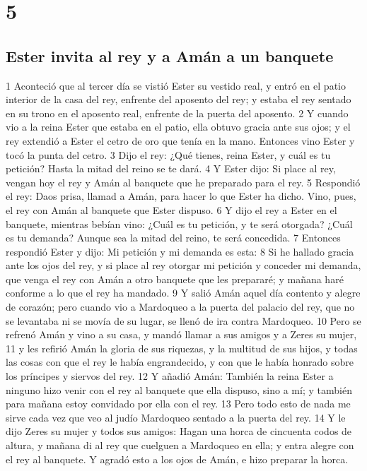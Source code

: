 \chapter{5}

\section*{Ester invita al rey y a Amán a un banquete}

1 Aconteció que al tercer día se vistió Ester su vestido real, y entró en el patio interior de la casa del rey, enfrente del aposento del rey; y estaba el rey sentado en su trono en el aposento real, enfrente de la puerta del aposento.
2 Y cuando vio a la reina Ester que estaba en el patio, ella obtuvo gracia ante sus ojos; y el rey extendió a Ester el cetro de oro que tenía en la mano. Entonces vino Ester y tocó la punta del cetro.
3 Dijo el rey: ¿Qué tienes, reina Ester, y cuál es tu petición? Hasta la mitad del reino se te dará.
4 Y Ester dijo: Si place al rey, vengan hoy el rey y Amán al banquete que he preparado para el rey.
5 Respondió el rey: Daos prisa, llamad a Amán, para hacer lo que Ester ha dicho. Vino, pues, el rey con Amán al banquete que Ester dispuso. 
6 Y dijo el rey a Ester en el banquete, mientras bebían vino: ¿Cuál es tu petición, y te será otorgada? ¿Cuál es tu demanda? Aunque sea la mitad del reino, te será concedida.
7 Entonces respondió Ester y dijo: Mi petición y mi demanda es esta:
8 Si he hallado gracia ante los ojos del rey, y si place al rey otorgar mi petición y conceder mi demanda, que venga el rey con Amán a otro banquete que les prepararé; y mañana haré conforme a lo que el rey ha mandado.
9 Y salió Amán aquel día contento y alegre de corazón; pero cuando vio a Mardoqueo a la puerta del palacio del rey, que no se levantaba ni se movía de su lugar, se llenó de ira contra Mardoqueo.
10 Pero se refrenó Amán y vino a su casa, y mandó llamar a sus amigos y a Zeres su mujer,
11 y les refirió Amán la gloria de sus riquezas, y la multitud de sus hijos, y todas las cosas con que el rey le había engrandecido, y con que le había honrado sobre los príncipes y siervos del rey.
12 Y añadió Amán: También la reina Ester a ninguno hizo venir con el rey al banquete que ella dispuso, sino a mí; y también para mañana estoy convidado por ella con el rey.
13 Pero todo esto de nada me sirve cada vez que veo al judío Mardoqueo sentado a la puerta del rey.
14 Y le dijo Zeres su mujer y todos sus amigos: Hagan una horca de cincuenta codos   de altura, y mañana di al rey que cuelguen a Mardoqueo en ella; y entra alegre con el rey al banquete. Y agradó esto a los ojos de Amán, e hizo preparar la horca.

